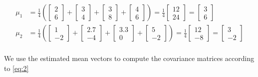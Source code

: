 \documentclass[a4paper, 10pt, twoside]{article}
\begin{document}
\begin{enumerate}[a)]
          \begin{align*}
              \mu_1 & = \frac{1}{4}
              \left(
              \begin{bmatrix}2 \\ 6\end{bmatrix} +
              \begin{bmatrix}3 \\ 4\end{bmatrix} +
              \begin{bmatrix}3 \\ 8\end{bmatrix} +
              \begin{bmatrix}4 \\ 6\end{bmatrix}
              \right)
              = \frac{1}{4}\begin{bmatrix}12 \\ 24\end{bmatrix}
              = \begin{bmatrix}3 \\ 6\end{bmatrix}  \\
              \mu_2 & = \frac{1}{4}
              \left(
              \begin{bmatrix}1 \\ -2\end{bmatrix} +
              \begin{bmatrix}2.7 \\ -4\end{bmatrix} +
              \begin{bmatrix}3.3 \\ 0\end{bmatrix} +
              \begin{bmatrix}5 \\ -2\end{bmatrix}
              \right)
              = \frac{1}{4}\begin{bmatrix}12 \\ -8\end{bmatrix}
              = \begin{bmatrix}3 \\ -2\end{bmatrix} \\
          \end{align*}

          We use the estimated mean vectors to compute the covariance matrices according to \eqref{eq:2}


\end{enumerate}
\end{document}
